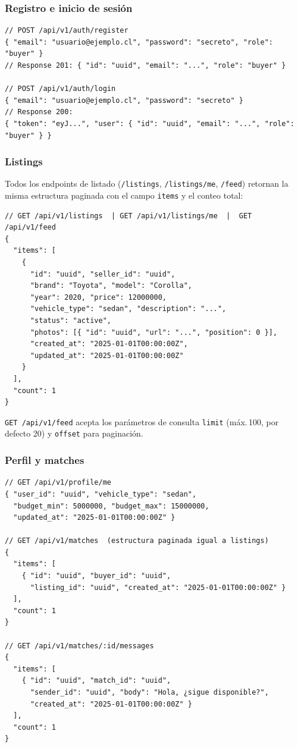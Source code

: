 \documentclass[12pt,a4paper]{article}
\begin{document}
\subsubsection{Registro e inicio de sesión}

\begin{lstlisting}[style=gostyle, numbers=none]
// POST /api/v1/auth/register
{ "email": "usuario@ejemplo.cl", "password": "secreto", "role": "buyer" }
// Response 201: { "id": "uuid", "email": "...", "role": "buyer" }

// POST /api/v1/auth/login
{ "email": "usuario@ejemplo.cl", "password": "secreto" }
// Response 200:
{ "token": "eyJ...", "user": { "id": "uuid", "email": "...", "role": "buyer" } }
\end{lstlisting}

\subsubsection{Listings}

Todos los endpoints de listado (\texttt{/listings}, \texttt{/listings/me}, \texttt{/feed})
retornan la misma estructura paginada con el campo \texttt{items} y el conteo total:

\begin{lstlisting}[style=gostyle, numbers=none]
// GET /api/v1/listings  | GET /api/v1/listings/me  |  GET /api/v1/feed
{
  "items": [
    {
      "id": "uuid", "seller_id": "uuid",
      "brand": "Toyota", "model": "Corolla",
      "year": 2020, "price": 12000000,
      "vehicle_type": "sedan", "description": "...",
      "status": "active",
      "photos": [{ "id": "uuid", "url": "...", "position": 0 }],
      "created_at": "2025-01-01T00:00:00Z",
      "updated_at": "2025-01-01T00:00:00Z"
    }
  ],
  "count": 1
}
\end{lstlisting}

\texttt{GET /api/v1/feed} acepta los parámetros de consulta \texttt{limit} (máx.\,100,
por defecto 20) y \texttt{offset} para paginación.

\subsubsection{Perfil y matches}

\begin{lstlisting}[style=gostyle, numbers=none]
// GET /api/v1/profile/me
{ "user_id": "uuid", "vehicle_type": "sedan",
  "budget_min": 5000000, "budget_max": 15000000,
  "updated_at": "2025-01-01T00:00:00Z" }

// GET /api/v1/matches  (estructura paginada igual a listings)
{
  "items": [
    { "id": "uuid", "buyer_id": "uuid",
      "listing_id": "uuid", "created_at": "2025-01-01T00:00:00Z" }
  ],
  "count": 1
}

// GET /api/v1/matches/:id/messages
{
  "items": [
    { "id": "uuid", "match_id": "uuid",
      "sender_id": "uuid", "body": "Hola, ¿sigue disponible?",
      "created_at": "2025-01-01T00:00:00Z" }
  ],
  "count": 1
}
\end{lstlisting}
\end{document}
